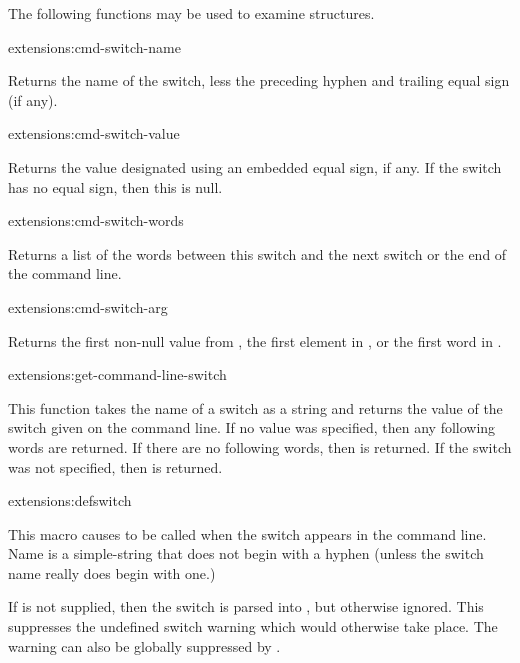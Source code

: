 The following functions may be used to examine 
structures.
\begin{defun}{extensions:}{cmd-switch-name}{}
  
  Returns the name of the switch, less the preceding hyphen and
  trailing equal sign (if any).
\end{defun}
\begin{defun}{extensions:}{cmd-switch-value}{}
  
  Returns the value designated using an embedded equal sign, if any.
  If the switch has no equal sign, then this is null.
\end{defun}
\begin{defun}{extensions:}{cmd-switch-words}{}
  
  Returns a list of the words between this switch and the next switch
  or the end of the command line.
\end{defun}
\begin{defun}{extensions:}{cmd-switch-arg}{}
  
  Returns the first non-null value from , the
  first element in , or the first word in
  .
\end{defun}

\begin{defun}{extensions:}{get-command-line-switch}{}
  
  This function takes the name of a switch as a string and returns the
  value of the switch given on the command line.  If no value was
  specified, then any following words are returned.  If there are no
  following words, then \true{} is returned.  If the switch was not
  specified, then \false{} is returned.
\end{defun}

\begin{defmac}{extensions:}{defswitch}{%
    }
  
  This macro causes  to be called when the switch
   appears in the command line.  Name is a simple-string
  that does not begin with a hyphen (unless the switch name really
  does begin with one.)
  
  If  is not supplied, then the switch is parsed into
  , but otherwise ignored.  This suppresses
  the undefined switch warning which would otherwise take place.  The
  warning can also be globally suppressed by
  .
\end{defmac}


